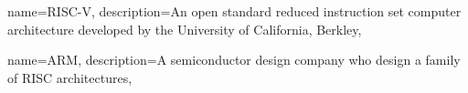 \makeglossaries

{
    name={RISC-V},
    description={An open standard reduced instruction set computer architecture developed by the University of California, Berkley},
}

{
    name={ARM},
    description={A semiconductor design company who design a family of RISC architectures},
}